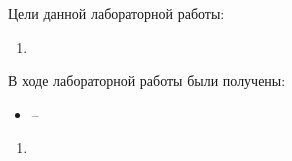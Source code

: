 
Цели данной лабораторной работы:
\begin{enumerate}
	\item 
\end{enumerate}



\begin{figure}[!htbp]
	\centering
	\caption{}
\end{figure}
\FloatBarrier

%



В ходе лабораторной работы были получены:  
\begin{itemize}
	\item --
\end{itemize}


\begin{enumerate}
	\item \textit{}\newline 
\end{enumerate}
